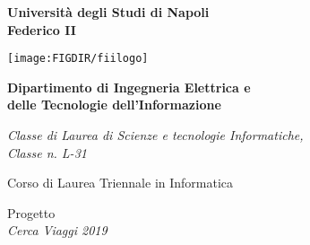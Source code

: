 %
%
%

%
%
\pagestyle{empty}
\begin{center}

%

{\bfseries\Huge Università degli Studi di Napoli\\}
\vspace{2.54mm}
{\bfseries\Huge Federico II\\}
\vspace{5mm}

\centerline{\mbox{\texttt{[image: \\FIGDIR/fiilogo]}}}

\medskip
{\bfseries\LARGE Dipartimento di Ingegneria Elettrica e\\}
\vspace{2.54mm}
{\bfseries\LARGE delle Tecnologie dell'Informazione\\}
\vspace{2.54mm}

{\emph{\large Classe di Laurea di Scienze e tecnologie Informatiche,\\}}
{\emph{\large Classe n. L-31\\}}
\vspace{2.54mm}

{\large Corso di Laurea Triennale in Informatica\\}
\vspace{5mm}


%
%

\vfill
{\Large Progetto\\}
\vspace{4mm}
{\emph{\LARGE Cerca Viaggi 2019\\}}		%
\vspace{4mm}

\vfill


\end{center}
